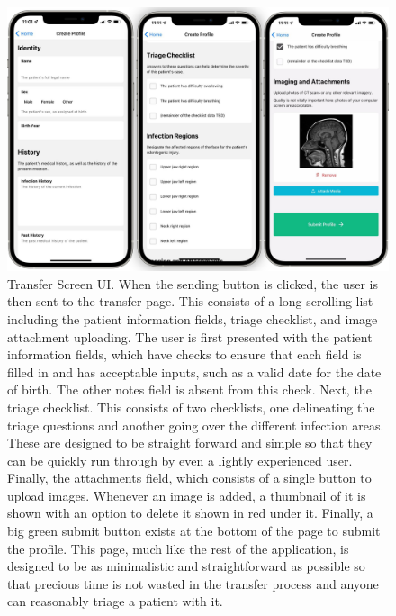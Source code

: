 \documentclass[11pt,letterpaper]{article}
\begin{document}
\begin{figure}
    \centering
    \includegraphics[width=5in]{Screenshots/ts.png}
    \caption{Transfer Screen UI. When the sending button is clicked, the user is then sent to the transfer page. This consists of a long scrolling list including the patient information fields, triage checklist, and image attachment uploading. The user is first presented with the patient information fields, which have checks to ensure that each field is filled in and has acceptable inputs, such as a valid date for the date of birth. The other notes field is absent from this check. Next, the triage checklist. This consists of two checklists, one delineating the triage questions and another going over the different infection areas. These are designed to be straight forward and simple so that they can be quickly run through by even a lightly experienced user. Finally, the attachments field, which consists of a single button to upload images. Whenever an image is added, a thumbnail of it is shown with an option to delete it shown in red under it. Finally, a big green submit button exists at the bottom of the page to submit the profile. This page, much like the rest of the application, is designed to be as minimalistic and straightforward as possible so that precious time is not wasted in the transfer process and anyone can reasonably triage a patient with it.}
    \label{fig:transferscreen}
\end{figure}
\end{document}

